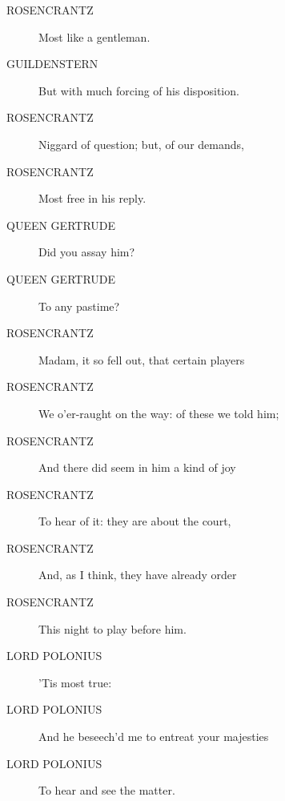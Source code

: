 \documentclass{article}
\begin{document}
\begin{description}
            
\item[ROSENCRANTZ] Most like a gentleman.
\end{description}
          
\begin{description}
            
\item[GUILDENSTERN] But with much forcing of his disposition.
\end{description}
          
\begin{description}
            
\item[ROSENCRANTZ] Niggard of question; but, of our demands,
\item[ROSENCRANTZ] Most free in his reply.
\end{description}
          
\begin{description}
            
\item[QUEEN GERTRUDE] Did you assay him?
\item[QUEEN GERTRUDE] To any pastime?
\end{description}
          
\begin{description}
            
\item[ROSENCRANTZ] Madam, it so fell out, that certain players
\item[ROSENCRANTZ] We o'er-raught on the way: of these we told him;
\item[ROSENCRANTZ] And there did seem in him a kind of joy
\item[ROSENCRANTZ] To hear of it: they are about the court,
\item[ROSENCRANTZ] And, as I think, they have already order
\item[ROSENCRANTZ] This night to play before him.
\end{description}
          
\begin{description}
            
\item[LORD POLONIUS] 'Tis most true:
\item[LORD POLONIUS] And he beseech'd me to entreat your majesties
\item[LORD POLONIUS] To hear and see the matter.
\end{description}
          
\end{document}
